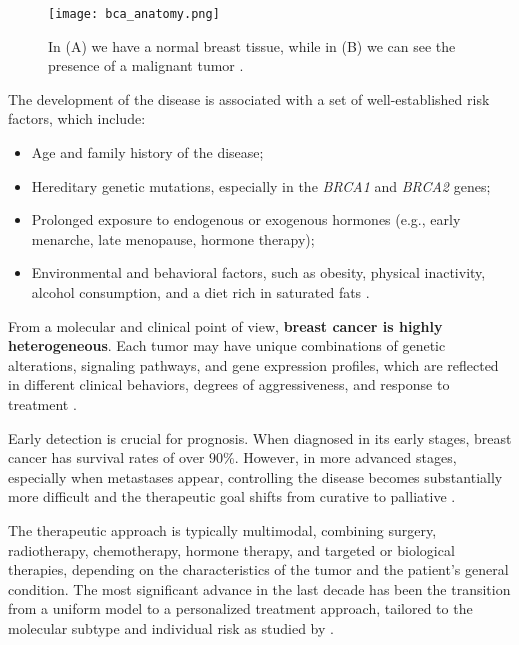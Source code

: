 \begin{figure}
  \centering
  \texttt{[image: bca\_anatomy.png]}
  \caption{In (A) we have a normal breast tissue, while in (B) we can see
    the presence of a malignant tumor \cite{bca_anatomy_figure_Muthu2020}.}
  \label{fig:breast_cancer_anatomy}
\end{figure}

The development of the disease is associated with a set of well-established
risk factors, which include:
\begin{itemize}
  \item Age and family history of the disease;
  \item Hereditary genetic mutations, especially in the \textit{BRCA1} and
        \textit{BRCA2} genes;
  \item Prolonged exposure to endogenous or exogenous hormones (e.g., early menarche,
        late menopause, hormone therapy);
  \item Environmental and behavioral factors, such as obesity, physical inactivity,
        alcohol consumption, and a diet rich in saturated fats
        \cite{BreastEpidemiology_Romanowicz2022,clinical_implication_bca_Adamo2015}.
\end{itemize}

From a molecular and clinical point of view, \textbf{breast cancer is highly
  heterogeneous}. Each tumor may have unique combinations of genetic alterations,
signaling pathways, and gene expression profiles, which are reflected in
different clinical behaviors, degrees of aggressiveness, and response to
treatment
\cite{origins_and_evolution_bca_Polyak2007,diff_bca_usa_Howlader2018}.

Early detection is crucial for prognosis. When diagnosed in its early stages,
breast cancer has survival rates of over $90\%$. However, in more advanced
stages, especially when metastases appear, controlling the disease becomes
substantially more difficult and the therapeutic goal shifts from curative to
palliative \cite{updatedbca_Hong2022Breast,clinical_implication_bca_Adamo2015}.

The therapeutic approach is typically multimodal, combining surgery,
radiotherapy, chemotherapy, hormone therapy, and targeted or biological
therapies, depending on the characteristics of the tumor and the patient's
general condition. The most significant advance in the last decade has been the
transition from a uniform model to a personalized treatment approach, tailored
to the molecular subtype and individual risk as studied by
\textcite{BreastEpidemiology_Romanowicz2022}.

